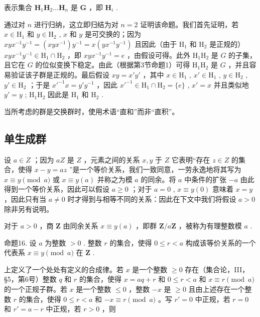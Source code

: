 表示集合 \(\mathbf{H}_1\mathbf{H}_2\ldots \mathbf{H}_n\) 是 \(\mathbf{G}\) ，即 \(\mathbf{H}_i\) .

通过对 \(n\) 进行归纳，这立即归结为对 \(n = 2\) 证明该命题。我们首先证明，若 \(x \in \mathrm{H}_1\) 和 \(y \in \mathrm{H}_2\) , \(x\) 和 \(y\) 是可交换的；因为 \(xyx^{-1}y^{-1} = (xyx^{-1})y^{-1} = x(yx^{-1}y^{-1})\) 且因此（由于 \(\mathrm{H}_1\) 和 \(\mathrm{H}_2\) 是正规的） \(xyx^{-1}y^{-1} \in \mathrm{H}_1 \cap \mathrm{H}_2\) ，即 \(xyx^{-1}y^{-1} = e\) ，由假设可得。此外 \(\mathrm{H}_1\mathrm{H}_2\) 是 \(G\) 的子集，且它在 \(G\) 的位似变换下稳定。由此（根据第3节命题1）可得 \(\mathrm{H}_1\mathrm{H}_2\) 是 \(G\) ，并且容易验证该子群是正规的。最后假设 \(xy = x'y'\) ，其中 \(x \in \mathrm{H}_1\) , \(x' \in \mathrm{H}_1\) , \(y \in \mathrm{H}_2\) , \(y' \in \mathrm{H}_2\) ；于是 \(x'^{-1}x = y'y^{-1}\) ，因此 \(x'^{-1} \in \mathrm{H}_1 \cap \mathrm{H}_2 = \{e\}\) , \(x' = x\) 并且类似地 \(y' = y\) ; \(\mathrm{H}_1\mathrm{H}_2\) 因此是 \(\mathrm{H}_1\) 和 \(\mathrm{H}_2\) .

当所考虑的群是交换群时，使用术语“直和”而非“直积”。

\subsection{单生成群}

设 \(a \in Z\) ；因为 \(aZ\) 是 \(Z\) ，元素之间的关系 \(x, y\) 于 \(Z\) 它表明“存在 \(z \in Z\) 的集合，使得 \(x - y = az\) ”是一个等价关系，我们一致同意，一劳永逸地将其写为 \(x \equiv y \pmod{a}\) 或 \(x \equiv y(a)\) 并称之为模 \(a\) 的同余。将 \(a\) 中条件的扩张 \(-a\) 由此得到一个等价关系，因此可以假设 \(a \geqslant 0\) ；对于 \(a = 0\) , \(x \equiv y(0)\) 意味着 \(x = y\) ，因此只有当 \(a \neq 0\) 时才得到与相等不同的关系：因此在下文中我们将假设 \(a > 0\) 除非另有说明。

对于 \(a > 0\) ，商 \(\mathbf{Z}\) 由同余关系 \(x \equiv y(a)\) ，即群 \(\mathbf{Z}/a\mathbf{Z}\) ，被称为有理整数模 \(a\) .

命题16. 设 \(a\) 为整数 \(>0\) . 整数 \(r\) 的集合，使得 \(0 \leqslant r < a\) 构成该等价关系的一个代表系 \(x \equiv y \pmod{a}\) 在 \(\mathbf{Z}\) .

上定义了一个处处有定义的合成律。若 \(x\) 是一个整数 \(\geqslant 0\) 存在（集合论，III，§5，第6号）整数 \(q\) 和 \(r\) 的集合，使得 \(x = aq + r\) 和 \(0 \leqslant r < a\) 和 \(x \equiv r \pmod{a}\) 的一个正规子群。若 \(x\) 是一个整数 \(\leqslant 0\) ，整数 \(-x\) 是 \(\geqslant 0\) 且由上述存在一个整数 \(r\) 的集合，使得 \(0 \leqslant r < a\) 和 \(-x \equiv r \pmod{a}\) 。写 \(r' = 0\) 中正规，若 \(r = 0\) 和 \(r' = a - r\) 中正规，若 \(r > 0\) ，则

